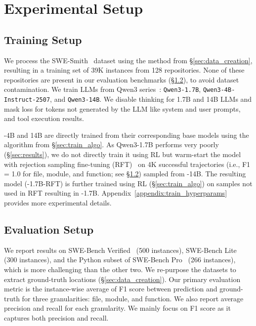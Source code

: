 
\section{Experimental Setup}
\label{sec:experiments}


\subsection{Training Setup}\label{sec:train_setup}
We process the SWE-Smith~\citep{yang2025swesmithscalingdatasoftware} dataset using the method from \S\ref{sec:data_creation}, resulting in a training set of 39K instances from 128 repositories. None of these repositories are present in our evaluation benchmarks (\S\ref{sec:eval_benchmarks}), to avoid dataset contamination. We train LLMs from Qwen3 series~\citep{yang2025qwen3technicalreport}: \texttt{Qwen3-1.7B}, \texttt{Qwen3-4B-Instruct-2507}, and \texttt{Qwen3-14B}. We disable thinking for 1.7B and 14B LLMs and mask loss for tokens not generated by the LLM like system and user prompts, and tool execution results. 

\methodname-4B and 14B are directly trained from their corresponding base models using the algorithm from \S\ref{sec:train_algo}. As Qwen3-1.7B performs very poorly (\S\ref{sec:results}), we do not directly train it using RL but warm-start the model with rejection sampling fine-tuning (RFT)~\citep{yuan2023scalingrelationshiplearningmathematical} on 4K successful trajectories (i.e., F1 = 1.0 for file, module, and function; see \S\ref{sec:eval_benchmarks}) sampled from \methodname-14B. The resulting model (\methodname-1.7B-RFT) is further trained using RL (\S\ref{sec:train_algo}) on samples not used in RFT resulting in \methodname-1.7B. Appendix~\ref{appendix:train_hyperparams} provides more experimental details. 
\subsection{Evaluation Setup}\label{sec:eval_benchmarks}

We report results on SWE-Bench Verified~\citep{chowdhury2024swebenchverified} (500 instances), SWE-Bench Lite~\citep{jimenez2024swebenchlanguagemodelsresolve} (300 instances), and the Python subset of SWE-Bench Pro~\citep{deng2025swebenchproaiagents} (266 instances), which is more challenging than the other two. We re-purpose the datasets to extract ground-truth locations (\S\ref{sec:data_creation}). Our primary evaluation metric is the instance-wise average of F1 score between prediction and ground-truth for three granularities: file, module, and function. We also report average precision and recall for each granularity. We mainly focus on F1 score as it captures both precision and recall.

